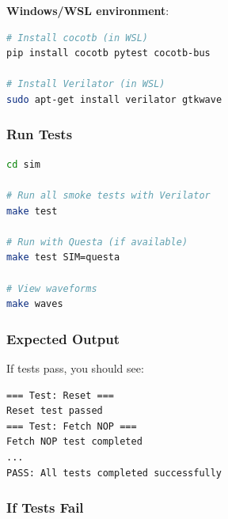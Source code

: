 \begin{record}

\textbf{Windows/\allowbreak{}WSL environment}:

\begin{lstlisting}[language=bash]
# Install cocotb (in WSL)
pip install cocotb pytest cocotb-bus

# Install Verilator (in WSL)
sudo apt-get install verilator gtkwave
\end{lstlisting}

\end{record}

\subsubsection{Run Tests}\label{cr:fix:cpu-verification-ready:run-tests}

\begin{record}

\begin{lstlisting}[language=bash]
cd sim

# Run all smoke tests with Verilator
make test

# Run with Questa (if available)
make test SIM=questa

# View waveforms
make waves
\end{lstlisting}

\end{record}

\subsubsection{Expected Output}\label{cr:fix:cpu-verification-ready:expected-output}

\begin{record}

If tests pass, you should see:

\begin{lstlisting}[language={}]
=== Test: Reset ===
Reset test passed
=== Test: Fetch NOP ===
Fetch NOP test completed
...
PASS: All tests completed successfully
\end{lstlisting}

\end{record}

\subsubsection{If Tests Fail}\label{cr:fix:cpu-verification-ready:if-tests-fail}

